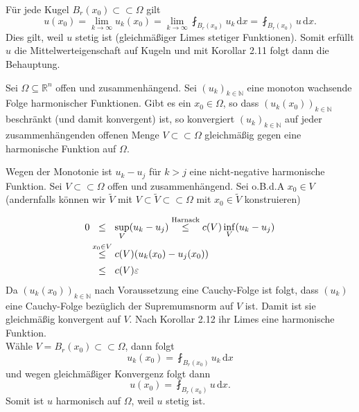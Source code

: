\begin{beweis}
	Für jede Kugel $B_r(x_0) \subset \subset \Omega$ gilt 
	\[
		u(x_0)= \lim_{k \to \infty}u_k(x_0) = \lim_{k \to \infty} \fint_{B_r(x_0)}^{}u_k \,\mathrm{d}x = \fint_{B_r(x_0)}^{}u \,\mathrm{d}x.
	\]
	Dies gilt, weil $u$ stetig ist (gleichmäßiger Limes stetiger Funktionen). 
	Somit erfüllt $u$ die Mittelwerteigenschaft auf Kugeln und mit Korollar 2.11 folgt dann die Behauptung.
\end{beweis}

\begin{korollar}
	Sei $\Omega \subseteq \mathbb{R}^n$ offen und zusammenhängend. Sei $(u_k)_{k \in \mathbb{N}}$ eine monoton wachsende Folge harmonischer Funktionen. 
	Gibt es ein $x_0 \in \Omega$, so dass $(u_k(x_0))_{k \in \mathbb{N}}$ beschränkt (und damit konvergent) ist, so konvergiert $(u_k)_{k \in \mathbb{N}}$ auf jeder
	zusammenhängenden offenen Menge $V \subset \subset \Omega$ gleichmäßig gegen eine harmonische Funktion auf $\Omega$.
\end{korollar}

\begin{beweis}
	Wegen der Monotonie ist $u_k-u_j$ für $k > j$ eine nicht-negative harmonische Funktion. Sei $V \subset \subset \Omega$ offen und zusammenhängend. 
	Sei o.B.d.A $x_0 \in V$ (andernfalls können wir $ \tilde V$ mit $V \subset \tilde V \subset \subset \Omega$ mit $x_0 \in \tilde V$ konstruieren)
	
	
	\begin{align*}
		0 &\stackrel{\hphantom{x_0 \in V}}{\leq} \sup_V(u_k-u_j) \stackrel{\text{Harnack}}{\leq} c(V) \inf_V(u_k-u_j) \\
		& \stackrel{x_0 \in V}{\leq} c(V) (u_k(x_0)-u_j(x_0)) \\
		&\stackrel{\hphantom{x_0 \in V}}{\leq} c(V) \varepsilon
	\end{align*}
	Da $(u_k(x_0))_{k \in \mathbb{N}}$ nach Voraussetzung eine Cauchy-Folge ist folgt, dass $(u_k)$ eine Cauchy-Folge bezüglich der Supremumsnorm auf $V$ ist. 
	Damit ist sie gleichmäßig konvergent auf $V$. Nach Korollar 2.12 ihr Limes eine harmonische Funktion. \\
	Wähle $V = B_r(x_0) \subset \subset \Omega$, dann folgt
	\begin{equation}
		u_k(x_0) = \fint_{B_r(x_0)}^{}u_k \,\mathrm{d}x 
	\end{equation}
	und wegen gleichmäßiger Konvergenz folgt dann
	\begin{equation}
	u(x_0) = \fint_{B_r(x_0)}^{}u \,\mathrm{d}x.
	\end{equation}
	Somit ist $u$ harmonisch auf $\Omega$, weil $u$ stetig ist.
\end{beweis}

